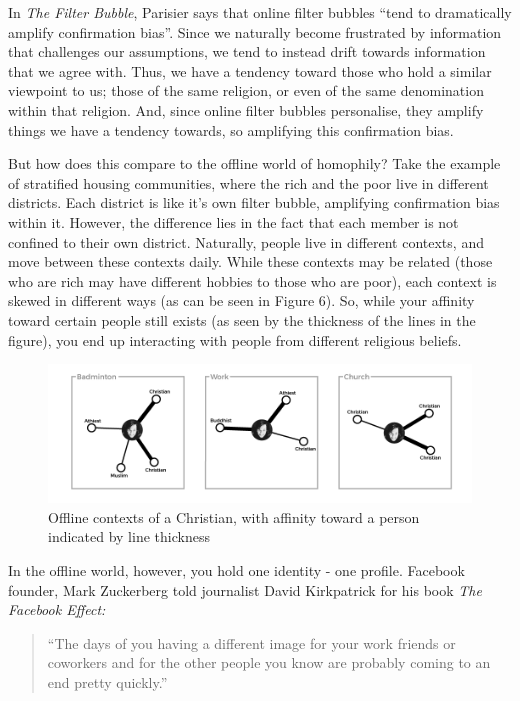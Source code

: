 \documentclass[]{article}
\begin{document}
In \emph{The Filter Bubble}, Parisier says that online filter bubbles
``tend to dramatically amplify confirmation
bias''\autocite[pg 88]{PariserFilterBubblewhat2012}. Since we naturally
become frustrated by information that challenges our assumptions, we
tend to instead drift towards information that we agree with. Thus, we
have a tendency toward those who hold a similar viewpoint to us; those
of the same religion, or even of the same denomination within that
religion. And, since online filter bubbles personalise, they amplify
things we have a tendency towards, so amplifying this confirmation
bias\autocite[pg 88]{PariserFilterBubblewhat2012}.

But how does this compare to the offline world of homophily? Take the
example of stratified housing communities, where the rich and the poor
live in different districts. Each district is like it's own filter
bubble, amplifying confirmation bias within it. However, the difference
lies in the fact that each member is not confined to their own district.
Naturally, people live in different contexts, and move between these
contexts daily. While these contexts may be related (those who are rich
may have different hobbies to those who are poor), each context is
skewed in different ways (as can be seen in Figure 6). So, while your
affinity toward certain people still exists (as seen by the thickness of
the lines in the figure), you end up interacting with people from
different religious beliefs.

\begin{figure}
\centering
\includegraphics{./NetworkDiagram1_1.png}
\caption{Offline contexts of a Christian, with affinity toward a person
indicated by line thickness}
\end{figure}

In the offline world, however, you hold one identity - one profile.
Facebook founder, Mark Zuckerberg told journalist David Kirkpatrick for
his book \emph{The Facebook Effect:}

\begin{quote}
``The days of you having a different image for your work friends or
coworkers and for the other people you know are probably coming to an
end pretty
quickly.''\autocite[pg 119]{KirkpatrickFacebookeffectstory2011}
\end{quote}
\end{document}
